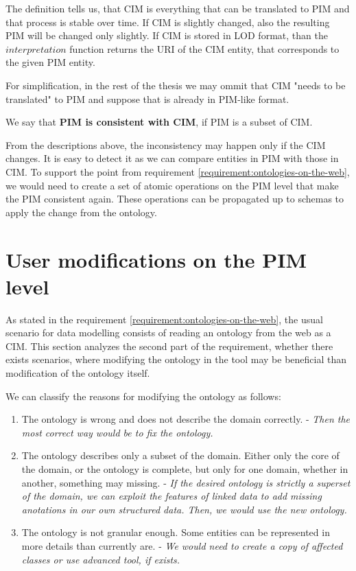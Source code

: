 The definition tells us, that CIM is everything that can be translated to PIM and that process is stable over time. If CIM is slightly changed, also the resulting PIM will be changed only slightly. If CIM is stored in LOD format, than the $interpretation$ function returns the URI of the CIM entity, that corresponds to the given PIM entity.

For simplification, in the rest of the thesis we may ommit that CIM "needs to be translated" to PIM and suppose that is already in PIM-like format.

\begin{definition}[consistency]
    We say that \textbf{PIM is consistent with CIM}, if PIM is a subset of CIM.
\end{definition}

From the descriptions above, the inconsistency may happen only if the CIM changes. It is easy to detect it as we can compare entities in PIM with those in CIM. To support the  point from requirement \ref{requirement:ontologies-on-the-web}, we would need to create a set of atomic operations on the PIM level that make the PIM consistent again. These operations can be propagated up to schemas to apply the change from the ontology.

\section{User modifications on the PIM level}

As stated in the requirement \ref{requirement:ontologies-on-the-web}, the usual scenario for data modelling consists of reading an ontology from the web as a CIM. This section analyzes the second part of the requirement, whether there exists scenarios, where modifying the ontology in the tool may be beneficial than modification of the ontology itself.


We can classify the reasons for modifying the ontology as follows:

\begin{enumerate}
    \item The ontology is wrong and does not describe the domain correctly. - \textit{Then the most correct way would be to fix the ontology.}
    \item The ontology describes only a subset of the domain. Either only the core of the domain, or the ontology is complete, but only for one domain, whether in another, something may missing. - \textit{If the desired ontology is strictly a superset of the domain, we can exploit the features of linked data to add missing anotations in our own structured data. Then, we would use the new ontology.}
    \item The ontology is not granular enough. Some entities can be represented in more details than currently are. - \textit{We would need to create a copy of affected classes or use advanced tool, if exists.}
\end{enumerate}

